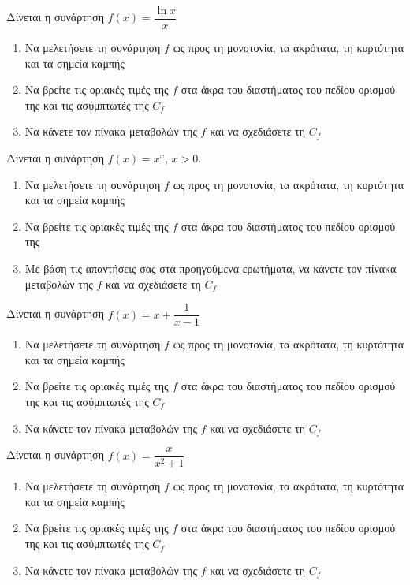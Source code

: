 \documentclass{presentation}
\begin{document}
\begin{askisi}
  Δίνεται η συνάρτηση $f(x)=\dfrac{\ln x}{x}$
  \begin{enumerate}[<+->]
    \item Να μελετήσετε τη συνάρτηση $f$ ως προς τη μονοτονία, τα ακρότατα, τη κυρτότητα και τα σημεία καμπής
    \item Να βρείτε τις οριακές τιμές της $f$ στα άκρα του διαστήματος του πεδίου ορισμού της και τις ασύμπτωτές της $C_f$
    \item Να κάνετε τον πίνακα μεταβολών της $f$ και να σχεδιάσετε τη $C_f$
  \end{enumerate}
\end{askisi}

\begin{askisi}
  Δίνεται η συνάρτηση $f(x)=x^x$, $x>0$.
  \begin{enumerate}
    \item Να μελετήσετε τη συνάρτηση $f$ ως προς τη μονοτονία, τα ακρότατα, τη κυρτότητα και τα σημεία καμπής
    \item Να βρείτε τις οριακές τιμές της $f$ στα άκρα του διαστήματος του πεδίου ορισμού της
    \item Με βάση τις απαντήσεις σας στα προηγούμενα ερωτήματα, να κάνετε τον πίνακα μεταβολών της $f$ και να σχεδιάσετε τη $C_f$
  \end{enumerate}
\end{askisi}

\begin{askisi}
  Δίνεται η συνάρτηση $f(x)=x+\dfrac{1}{x-1}$
  \begin{enumerate}[<+->]
    \item Να μελετήσετε τη συνάρτηση $f$ ως προς τη μονοτονία, τα ακρότατα, τη κυρτότητα και τα σημεία καμπής
    \item Να βρείτε τις οριακές τιμές της $f$ στα άκρα του διαστήματος του πεδίου ορισμού της και τις ασύμπτωτές της $C_f$
    \item Να κάνετε τον πίνακα μεταβολών της $f$ και να σχεδιάσετε τη $C_f$
  \end{enumerate}
\end{askisi}

\begin{askisi}
  Δίνεται η συνάρτηση $f(x)=\dfrac{x}{x^2+1}$
  \begin{enumerate}[<+->]
    \item Να μελετήσετε τη συνάρτηση $f$ ως προς τη μονοτονία, τα ακρότατα, τη κυρτότητα και τα σημεία καμπής
    \item Να βρείτε τις οριακές τιμές της $f$ στα άκρα του διαστήματος του πεδίου ορισμού της και τις ασύμπτωτές της $C_f$
    \item Να κάνετε τον πίνακα μεταβολών της $f$ και να σχεδιάσετε τη $C_f$
  \end{enumerate}
\end{askisi}
\end{document}
